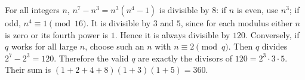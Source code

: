 For all integers $n$, $n^7-n^3=n^3(n^4-1)$ is divisible by $8$: if $n$ is even, use $n^3$; if odd, $n^4\equiv1\pmod{16}$. It is divisible by $3$ and $5$, since for each modulus either $n$ is zero or its fourth power is $1$. Hence it is always divisible by $120$. Conversely, if $q$ works for all large $n$, choose such an $n$ with $n\equiv2\pmod q$. Then $q$ divides $2^7-2^3=120$. Therefore the valid $q$ are exactly the divisors of $120=2^3\cdot3\cdot5$. Their sum is $(1+2+4+8)(1+3)(1+5)=\boxed{360}$.
